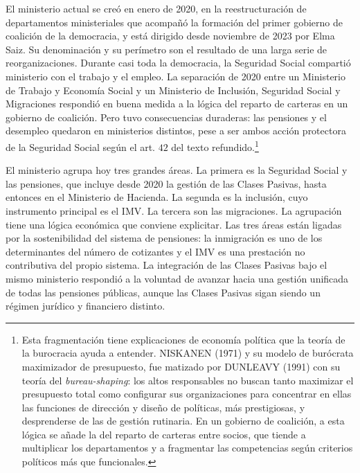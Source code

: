 \documentclass[10pt,a4paper]{article}
\begin{document}
El ministerio actual se creó en enero de 2020, en la reestructuración de departamentos ministeriales que acompañó la formación del primer gobierno de coalición de la democracia, y está dirigido desde noviembre de 2023 por Elma Saiz. Su denominación y su perímetro son el resultado de una larga serie de reorganizaciones. Durante casi toda la democracia, la Seguridad Social compartió ministerio con el trabajo y el empleo. La separación de 2020 entre un Ministerio de Trabajo y Economía Social y un Ministerio de Inclusión, Seguridad Social y Migraciones respondió en buena medida a la lógica del reparto de carteras en un gobierno de coalición. Pero tuvo consecuencias duraderas: las pensiones y el desempleo quedaron en ministerios distintos, pese a ser ambos acción protectora de la Seguridad Social según el art. $42$ del texto refundido.\footnote{Esta fragmentación tiene explicaciones de economía política que la teoría de la burocracia ayuda a entender. NISKANEN (1971) y su modelo de burócrata maximizador de presupuesto, fue matizado por DUNLEAVY (1991) con su teoría del \textit{bureau-shaping}: los altos responsables no buscan tanto maximizar el presupuesto total como configurar sus organizaciones para concentrar en ellas las funciones de dirección y diseño de políticas, más prestigiosas, y desprenderse de las de gestión rutinaria. En un gobierno de coalición, a esta lógica se añade la del reparto de carteras entre socios, que tiende a multiplicar los departamentos y a fragmentar las competencias según criterios políticos más que funcionales.
}

El ministerio agrupa hoy tres grandes áreas. La primera es la Seguridad Social y las pensiones, que incluye desde 2020 la gestión de las Clases Pasivas, hasta entonces en el Ministerio de Hacienda. La segunda es la inclusión, cuyo instrumento principal es el IMV. La tercera son las migraciones. La agrupación tiene una lógica económica que conviene explicitar. Las tres áreas están ligadas por la sostenibilidad del sistema de pensiones: la inmigración es uno de los determinantes del número de cotizantes y el IMV es una prestación no contributiva del propio sistema. La integración de las Clases Pasivas bajo el mismo ministerio respondió a la voluntad de avanzar hacia una gestión unificada de todas las pensiones públicas, aunque las Clases Pasivas sigan siendo un régimen jurídico y financiero distinto.
\end{document}
